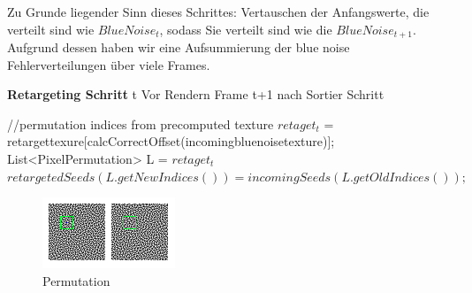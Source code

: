 \cite{hal02158423}

Zu Grunde liegender Sinn dieses Schrittes: Vertauschen der Anfangswerte, die 
verteilt sind wie $BlueNoise_{t}$, sodass Sie verteilt sind wie die 
$BlueNoise_{t+1}$. Aufgrund dessen haben wir eine Aufsummierung der
blue noise Fehlerverteilungen über viele Frames.

\begin{algorithm}[H]
    \caption{\textbf{Retargeting Schritt} t Vor Rendern Frame t+1 nach Sortier Schritt}
    \begin{algorithmic}[1]
        \State //permutation indices from precomputed texture
        \State $retaget_{t}$ = retargettexure[calcCorrectOffset(incomingbluenoisetexture)];
        \State List<PixelPermutation> L = $retaget_{t}$
        \State $retargetedSeeds(L.getNewIndices()) = incomingSeeds(L.getOldIndices());$
        \EndFor
    \end{algorithmic}
    \label{alg:retargetingAlg}
\end{algorithm}

\begin{figure}[H]\label{pic:Permutation}
    \centering
    \includegraphics[width=0.5\linewidth]{content/simulatedAnnealing/Bilder/Permutation.png}
    \caption{Permutation}
\end{figure}


